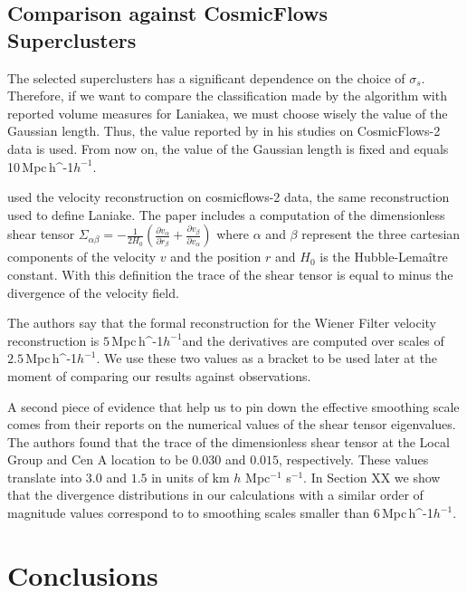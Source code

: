 \documentclass[usenatbib]{mnras}
\newcommand{\Mpch}{\,{\rm Mpc}\,\ifmmode h^{-1}\else $h^{-1}$\fi}
\begin{document}
\subsection{Comparison against CosmicFlows Superclusters}

The selected superclusters has a significant dependence on the choice of $\sigma_s$. Therefore, if we want to compare the classification made by the algorithm with reported volume measures for Laniakea, we must choose wisely the value of the Gaussian length. Thus, the value reported by \cite{2014Natur.513...71T} in his studies on CosmicFlows-2 data is used. From now on, the value of the Gaussian length is fixed and equals 10\Mpch. 



\cite{2015MNRAS.452.1052L} used the velocity reconstruction on cosmicflows-2 data, the same reconstruction used to define Laniake.
The paper includes a computation of the dimensionless shear tensor $\Sigma_{\alpha\beta}=-\frac{1}{2H_0}\left(\frac{\partial v_\alpha}{\partial r_\beta}+\frac{\partial v_\beta}{\partial v_\alpha}\right)$ where $\alpha$ and $\beta$ represent the three cartesian components of the velocity $v$ and the position $r$ and $H_0$ is the Hubble-Lema\^itre constant.
With this definition the trace of the shear tensor is equal to minus the divergence of the velocity field.


The authors say that the formal reconstruction for the Wiener Filter velocity reconstruction is $5$\Mpch and the derivatives are computed over scales of $2.5$\Mpch. 
We use these two values as a bracket to be used later at the moment of comparing our results against observations.

A second piece of evidence that help us to pin down the effective smoothing scale comes from their reports on the numerical values of the shear tensor eigenvalues.
The authors found that the trace of the dimensionless shear tensor at the Local Group and Cen A location to be $0.030$ and $0.015$, respectively. 
These values translate into $3.0$ and $1.5$ in units of km $h$ Mpc$^{-1}$ s$^{-1}$. 
In Section XX we show that the divergence distributions in our calculations with a similar order of magnitude values correspond to 
to smoothing scales smaller than $6$\Mpch.





\section{Conclusions}
\label{sec:conclusions}
\end{document}
